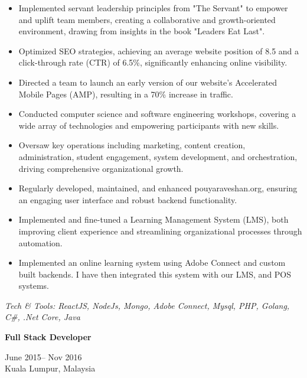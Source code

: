 \documentclass[10pt,a4paper,ragged2e,withhyper]{altacv}
\renewcommand{\cvevent}[4]{%
  \textbf{#1} %
  \hfill %
  \begin{minipage}[t]{.5\linewidth}
    \raggedleft %
    \small#3 %
    \\ %
    #4 %
  \end{minipage}
  \vspace{\baselineskip} %
}
\begin{document}
\begin{itemize}
  \item Implemented servant leadership principles from "The Servant" to empower and uplift team members, creating a collaborative and growth-oriented environment, drawing from insights in the book "Leaders Eat Last".
  \item Optimized SEO strategies, achieving an average website position of 8.5 and a click-through rate (CTR) of 6.5\%, significantly enhancing online visibility.
  \item Directed a team to launch an early version of our website's Accelerated Mobile Pages (AMP), resulting in a 70\% increase in traffic.
  \item Conducted computer science and software engineering workshops, covering a wide array of technologies and empowering participants with new skills.
  \item Oversaw key operations including marketing, content creation, administration, student engagement, system development, and orchestration, driving comprehensive organizational growth.
  \item Regularly developed, maintained, and enhanced pouyaraveshan.org, ensuring an engaging user interface and robust backend functionality.
  \item Implemented and fine-tuned a Learning Management System (LMS), both improving client experience and streamlining organizational processes through automation.
  \item Implemented an online learning system using Adobe Connect and custom built backends. I have then integrated this system with our LMS, and POS systems. 
\end{itemize}



\vspace{0.5cm}

\textit{Tech \& Tools: ReactJS, NodeJs, Mongo, Adobe Connect, Mysql, PHP, Golang, C\#, .Net Core, Java}

\divider

\cvevent{Full Stack Developer}{Cake Creative Digital Lab}{June 2015-- Nov 2016}{Kuala Lumpur, Malaysia}
\end{document}
